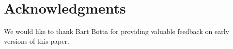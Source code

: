 \section{Acknowledgments} 

We would like to thank Bart Botta for providing valuable feedback on
early versions of this paper.
